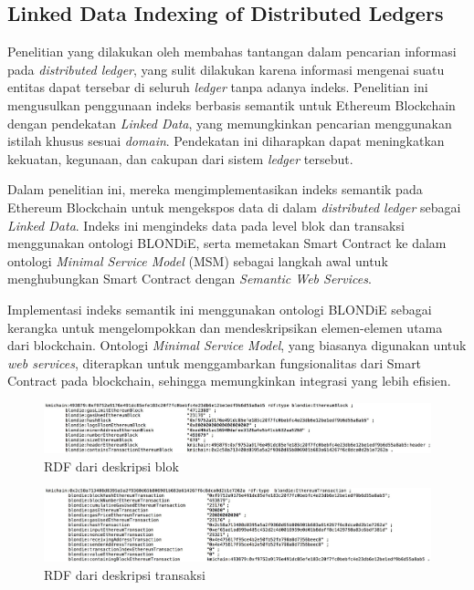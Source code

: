 \subsection{Linked Data Indexing of Distributed Ledgers}
\label{subsec:linked-data-indexing-distributed-ledgers}

Penelitian yang dilakukan oleh \cite{third2017linked} membahas tantangan dalam pencarian informasi pada \textit{distributed ledger}, yang sulit dilakukan karena informasi mengenai suatu entitas dapat tersebar di seluruh \textit{ledger} tanpa adanya indeks. Penelitian ini mengusulkan penggunaan indeks berbasis semantik untuk Ethereum Blockchain dengan pendekatan \textit{Linked Data}, yang memungkinkan pencarian menggunakan istilah khusus sesuai \textit{domain}. Pendekatan ini diharapkan dapat meningkatkan kekuatan, kegunaan, dan cakupan dari sistem \textit{ledger} tersebut.

Dalam penelitian ini, mereka mengimplementasikan indeks semantik pada Ethereum Blockchain untuk mengekspos data di dalam \textit{distributed ledger} sebagai \textit{Linked Data}. Indeks ini mengindeks data pada level blok dan transaksi menggunakan ontologi BLONDiE, serta memetakan Smart Contract ke dalam ontologi \textit{Minimal Service Model} (MSM) sebagai langkah awal untuk menghubungkan Smart Contract dengan \textit{Semantic Web Services}.

Implementasi indeks semantik ini menggunakan ontologi BLONDiE sebagai kerangka untuk mengelompokkan dan mendeskripsikan elemen-elemen utama dari blockchain. Ontologi \textit{Minimal Service Model}, yang biasanya digunakan untuk \textit{web services}, diterapkan untuk menggambarkan fungsionalitas dari Smart Contract pada blockchain, sehingga memungkinkan integrasi yang lebih efisien.

\begin{figure}
  \centering
  \includegraphics[width=1\textwidth]{resources/chapter-2/rdf-block.jpg}
  \caption{RDF dari deskripsi blok \parencite{third2017linked}}
  \label{image:rdf-block}
\end{figure}

\begin{figure}
  \centering
  \includegraphics[width=1\textwidth]{resources/chapter-2/rdf-transaction.jpg}
  \caption{RDF dari deskripsi transaksi \parencite{third2017linked}}
  \label{image:rdf-transaction}
\end{figure}

